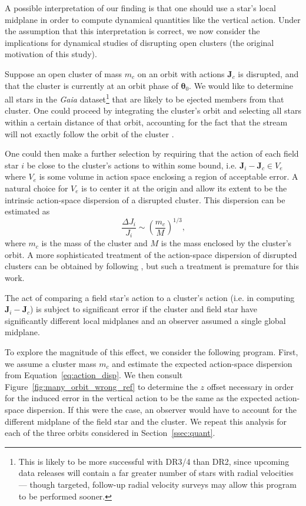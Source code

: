 \documentclass[twocolumn]{aastex62}
\newcommand{\beq}{\begin{equation}}
\newcommand{\eeq}{\end{equation}}
\begin{document}
A possible interpretation of our finding is that one should use a star's local
midplane in order to compute dynamical quantities like the vertical action.
Under the assumption that this interpretation is correct, we now consider the
implications for dynamical studies of disrupting open clusters (the original
motivation of this study).

Suppose an open cluster of mass $m_c$ on an orbit with actions $\bm{J}_c$ is
disrupted, and that the cluster is currently at an orbit phase of
$\bm{\theta}_0$. We would like to determine all stars in the {\em Gaia}
dataset\footnote{This is likely to be more successful with DR3/4 than DR2,
since upcoming data releases will contain a far greater number of stars with
radial velocities --- though targeted, follow-up radial velocity surveys may
allow this program to be performed sooner.} that are likely to be ejected
members from that cluster. One could proceed by integrating the cluster's
orbit and selecting all stars within a certain distance of that orbit,
accounting for the fact that the stream will not exactly follow the orbit of
the cluster \citep[e.g.][]{2011MNRAS.413.1852E}.

One could then make a further selection by requiring that the action of each
field star $i$ be close to the cluster's actions to within some bound, i.e.
$\bm{J}_i - \bm{J}_c \in V_e$ where $V_e$ is some volume in action space
enclosing a region of acceptable error. A natural choice for $V_e$ is to
center it at the origin and allow its extent to be the intrinsic action-space
dispersion of a disrupted cluster. This dispersion can be estimated as
\citep[\S~8.3.3][]{2008gady.book.....B}
\beq \label{eq:action_disp}
\frac{\Delta J_i}{J_i} \sim \left(\frac{m_c}{M}\right)^{1/3}\text{,}
\eeq
where $m_c$ is the mass of the cluster and $M$ is the mass enclosed by the
cluster's orbit. A more sophisticated treatment of the action-space dispersion
of disrupted clusters can be obtained by following
\citet{2011MNRAS.413.1852E}, but such a treatment is premature for this work.

The act of comparing a field star's action to a cluster's action (i.e. in
computing $\bm{J}_i - \bm{J}_c$) is subject to significant error if the
cluster and field star have significantly different local midplanes and an
observer assumed a single global midplane.

To explore the magnitude of this effect, we consider the following program.
First, we assume a cluster mass $m_c$ and estimate the expected action-space
dispersion from Equation~\ref{eq:action_disp}. We then consult
Figure~\ref{fig:many_orbit_wrong_ref} to determine the $z$ offset necessary in
order for the induced error in the vertical action to be the same as the
expected action-space dispersion. If this were the case, an observer would
have to account for the different midplane of the field star and the cluster.
We repeat this analysis for each of the three orbits considered in
Section~\ref{ssec:quant}.
\end{document}
